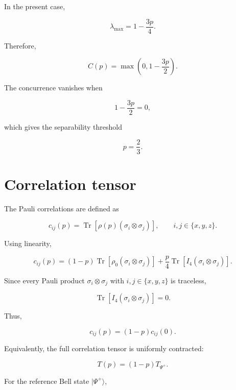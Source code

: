 In the present case,

\[
\lambda_{\max}
=
1-\frac{3p}{4}.
\]

Therefore,

\begin{equation}
C(p)
=
\max
\left(
0,
1-\frac{3p}{2}
\right).
\label{eq:appendix_depolarizing_concurrence}
\end{equation}

The concurrence vanishes when

\[
1-\frac{3p}{2}
=
0,
\]

which gives the separability threshold

\begin{equation}
p
=
\frac{2}{3}.
\label{eq:appendix_depolarizing_separability_threshold}
\end{equation}


\section*{Correlation tensor}

The Pauli correlations are defined as

\[
c_{ij}(p)
=
\operatorname{Tr}
\left[
\rho(p)
\left(
\sigma_i \otimes \sigma_j
\right)
\right],
\qquad
i,j \in \{x,y,z\}.
\]

Using linearity,

\[
c_{ij}(p)
=
(1-p)
\operatorname{Tr}
\left[
\rho_0
\left(
\sigma_i \otimes \sigma_j
\right)
\right]
+
\frac{p}{4}
\operatorname{Tr}
\left[
I_4
\left(
\sigma_i \otimes \sigma_j
\right)
\right].
\]

Since every Pauli product \( \sigma_i \otimes \sigma_j \) with \( i,j \in \{x,y,z\} \) is traceless,

\[
\operatorname{Tr}
\left[
I_4
\left(
\sigma_i \otimes \sigma_j
\right)
\right]
=
0.
\]

Thus,

\[
c_{ij}(p)
=
(1-p)c_{ij}(0).
\]

Equivalently, the full correlation tensor is uniformly contracted:

\begin{equation}
T(p)
=
(1-p)T_{\Psi^+}.
\label{eq:appendix_depolarizing_tensor_contraction}
\end{equation}

For the reference Bell state \( |\Psi^+\rangle \),

